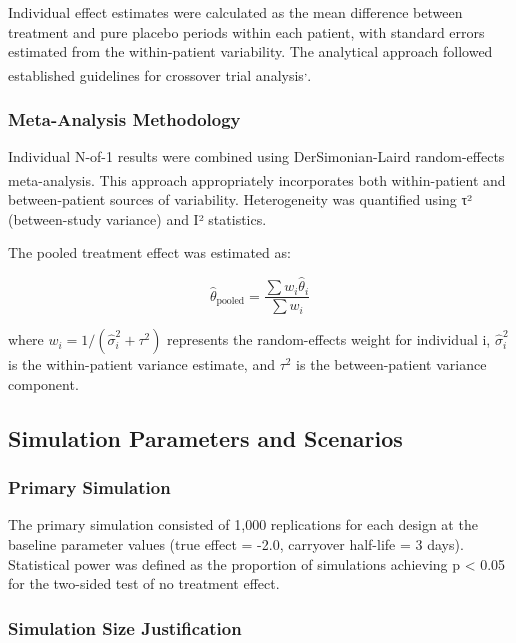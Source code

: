 \documentclass[
  11pt,
]{article}
\begin{document}
Individual effect estimates were calculated as the mean difference
between treatment and pure placebo periods within each patient, with
standard errors estimated from the within-patient variability. The
analytical approach followed established guidelines for crossover trial
analysis\textsuperscript{,}.

\subsubsection{Meta-Analysis
Methodology}\label{meta-analysis-methodology}

Individual N-of-1 results were combined using DerSimonian-Laird
random-effects
meta-analysis\textsuperscript{}.
This approach appropriately incorporates both within-patient and
between-patient sources of variability. Heterogeneity was quantified
using τ² (between-study variance) and I² statistics.

The pooled treatment effect was estimated as:

\[\hat{\theta}_{\text{pooled}} = \frac{\sum w_i \hat{\theta}_i}{\sum w_i}\]

where \(w_i = 1/(\hat{\sigma}_i^2 + \tau^2)\) represents the
random-effects weight for individual i, \(\hat{\sigma}_i^2\) is the
within-patient variance estimate, and \(\tau^2\) is the between-patient
variance component.

\subsection{Simulation Parameters and
Scenarios}\label{simulation-parameters-and-scenarios}

\subsubsection{Primary Simulation}\label{primary-simulation}

The primary simulation consisted of 1,000 replications for each design
at the baseline parameter values (true effect = -2.0, carryover
half-life = 3 days). Statistical power was defined as the proportion of
simulations achieving p \textless{} 0.05 for the two-sided test of no
treatment effect.

\subsubsection{Simulation Size
Justification}\label{simulation-size-justification}
\end{document}

